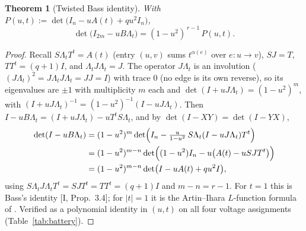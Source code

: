 \documentclass[11pt]{amsart}
\numberwithin{equation}{section}
\newtheorem{theorem}{Theorem}[section]
\theoremstyle{definition}
\theoremstyle{remark}
\newcommand{\La}{\Lambda}
\begin{document}
\begin{theorem}[Twisted Bass identity]\label{thm:bass}
With $P(u,t):=\det\bigl(I_n-uA(t)+qu^{2}I_n\bigr)$,
\[
\det\bigl(I_{2m}-uB\La_t\bigr)=(1-u^{2})^{\,r-1}\,P(u,t) .
\]
\end{theorem}

\begin{proof}
Recall $S\La_tT^{t}=A(t)$ (entry $(u,v)$ sums $t^{\alpha(e)}$ over $e\colon u\to v$),
$SJ=T$, $TT^{t}=(q{+}1)I$, and $\La_tJ\La_t=J$. The operator $J\La_t$ is an involution
($(J\La_t)^{2}=J\La_tJ\La_t=JJ=I$) with trace $0$ (no edge is its own reverse), so its
eigenvalues are $\pm1$ with multiplicity $m$ each and
$\det(I+uJ\La_t)=(1-u^{2})^{m}$, with $(I+uJ\La_t)^{-1}=(1-u^{2})^{-1}(I-uJ\La_t)$.
Then $I-uB\La_t=(I+uJ\La_t)-uT^{t}S\La_t$, and by $\det(I-XY)=\det(I-YX)$,
\begin{align*}
\det(I-uB\La_t)
&=(1-u^{2})^{m}\det\Bigl(I_n-\tfrac{u}{1-u^{2}}\,S\La_t(I-uJ\La_t)T^{t}\Bigr)\\
&=(1-u^{2})^{m-n}\det\Bigl((1-u^{2})I_n-u\bigl(A(t)-uSJT^{t}\bigr)\Bigr)\\
&=(1-u^{2})^{m-n}\det\bigl(I-uA(t)+qu^{2}I\bigr),
\end{align*}
using $S\La_tJ\La_tT^{t}=SJT^{t}=TT^{t}=(q{+}1)I$ and $m-n=r-1$. For $t=1$ this is
Bass's identity [I, Prop.~3.4]; for $|t|=1$ it is the Artin--Ihara $L$-function formula
of \cite{ST}. Verified as a polynomial identity in $(u,t)$ on all four voltage
assignments (Table~\ref{tab:battery}).
\end{proof}
\end{document}
